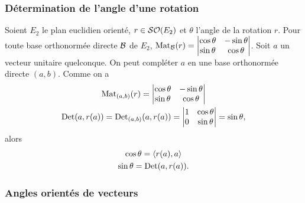 \subsubsection{Détermination de l'angle d'une rotation}

Soient \(E_2\) le plan euclidien orienté, \(r \in \mathcal{SO}\!\left(E_2\right)\) et 
\(\theta\) l'angle de la rotation \(r\). Pour toute base orthonormée directe 
\(\mathcal{B}\) de \(E_2\), \(\mathrm{Mat}_{\mathcal{B}}(r) = \begin{vmatrix} \cos\theta & -\sin\theta 
\\ \sin\theta & \cos\theta \end{vmatrix}\). Soit \(a\) un vecteur unitaire 
quelconque. On peut compléter \(a\) en une base orthonormée directe 
\((a,b)\). Comme on a
\begin{gather}
  \mathrm{Mat}_{(a,b)}(r)=\begin{vmatrix} \cos \theta & -\sin \theta \\ \sin\theta & 
  \cos\theta \end{vmatrix} \\
  \operatorname{Det}(a,r(a))= \operatorname{Det}_{(a,b)}(a,r(a)) = \begin{vmatrix} 1 & \cos \theta \\ 0 
  & \sin\theta \end{vmatrix}=\sin\theta,
\end{gather}
alors
\begin{gather}
  \cos \theta = \left\langle{r(a)},{a}\right\rangle \\
  \sin \theta = \operatorname{Det}(a,r(a)).
\end{gather}

\subsubsection{Angles orientés de vecteurs}

